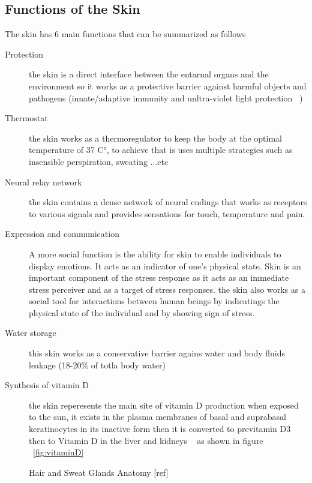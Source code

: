 \subsection{Functions of the Skin}
The skin has 6 main functions that can be summarized as follows~\cite{sarah2021}
\begin{description}
\item[Protection]
            the skin is a direct interface between the entarnal organs and the environment so it works as a protective barrier against harmful objects and pathogens (innate/adaptive immunity and unltra-violet light protection  ~\cite{joseph2020})
            
\item[Thermostat]
            the skin works as a thermoregulator to keep the body at the optimal temperature of 37 C°, to achieve that is uses multiple strategies such as insensible perspiration, sweating ...etc
\item[Neural relay network]
            the skin contains a dense network of neural endings that works as receptors to various signals and provides sensations for touch, temperature and pain.
\item[Expression and communication]
            A more social function
            is the ability for skin to enable individuals to display
            emotions. It acts as an indicator of one’s physical state.
            Skin is an important component of the stress response as it
            acts as an immediate stress perceiver and as a target of
            stress responses.
            the skin also works as a social tool for interactions between human beings by indicatings the physical state of the individual and by showing sign of stress.
\item[Water storage]
            this skin works as a conservative barrier agains water and body fluids leakage (18-20\% of totla body water)
\item[Synthesis of vitamin D]
            the skin reperesents the main site of vitamin D production when exposed to the sun, it exists in the plasma membranes of basal and suprabasal keratinocytes in its inactive form then it is converted to previtamin D3 then to Vitamin D in the liver and kidneys  ~\cite{joseph2020} as shown in figure ~\ref{fig:vitaminD}
\end{description}
\begin{figure}[htbp]
\begin{center}
\end{center}
\caption{Hair and Sweat Glands Anatomy [ref]}
\label{fig:barrier}
\end{figure}

